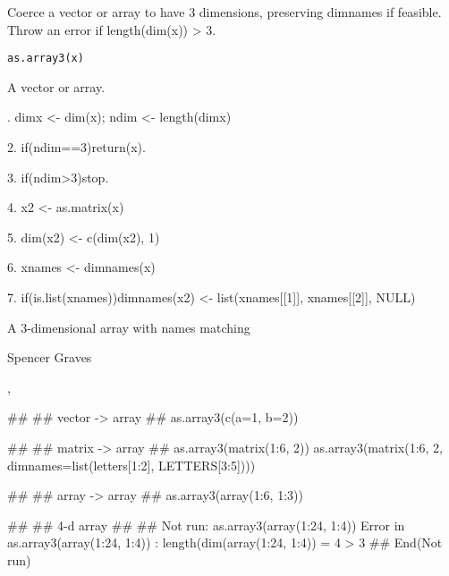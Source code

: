 \documentclass{article}
\begin{document}
\begin{Description}\relax
Coerce a vector or array to have 3 dimensions, preserving dimnames if
feasible.  Throw an error if length(dim(x)) > 3.
\end{Description}
\begin{Usage}
\begin{verbatim}
as.array3(x) 
\end{verbatim}
\end{Usage}
\begin{Arguments}
\begin{ldescription}
\item[\code{x}] A vector or array.  

\end{ldescription}
\end{Arguments}
\begin{Details}.  dimx <- dim(x);  ndim <- length(dimx) 

2.  if(ndim==3)return(x).

3.  if(ndim>3)stop.

4.  x2 <- as.matrix(x)

5.  dim(x2) <- c(dim(x2), 1)

6.  xnames <- dimnames(x)

7.  if(is.list(xnames))dimnames(x2) <- list(xnames[[1]], xnames[[2]],
NULL)
\end{Details}
\begin{Value}
A 3-dimensional array with names matching 
\end{Value}
\begin{Author}\relax
Spencer Graves
\end{Author}
\begin{SeeAlso}\relax
{},
\end{SeeAlso}
\begin{Examples}
\begin{ExampleCode}
##
## vector -> array 
##
as.array3(c(a=1, b=2)) 

##
## matrix -> array 
##
as.array3(matrix(1:6, 2))
as.array3(matrix(1:6, 2, dimnames=list(letters[1:2], LETTERS[3:5]))) 

##
## array -> array 
##
as.array3(array(1:6, 1:3)) 

##
## 4-d array 
##
## Not run: 
as.array3(array(1:24, 1:4)) 
Error in as.array3(array(1:24, 1:4)) : 
  length(dim(array(1:24, 1:4)) = 4 > 3
## End(Not run)
\end{ExampleCode}
\end{Examples}
\end{document}
